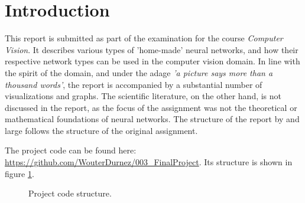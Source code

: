 


\section{Introduction}
\label{sec:intro}

This report is submitted as part of the examination for the course \textit{Computer Vision}. It describes various types of 'home-made' neural networks, and how their respective network types can be used in the computer vision domain. In line with the spirit of the domain, and under the adage \textit{'a picture says more than a thousand words'}, the report is accompanied by a substantial number of visualizations and graphs. The scientific literature, on the other hand, is not discussed in the report, as the focus of the assignment was not the theoretical or mathematical foundations of neural networks. The structure of the report by and large follows the structure of the original assignment. 

\vspace{5mm} %

The project code can be found here: \textcolor{blue}{\url{https://github.com/WouterDurnez/003_FinalProject}}. Its structure is shown in figure \ref{fig:project_structure}.

\begin{figure}[!htbp]
\begin{center}
\begin{minipage}{4cm}
\end{minipage}
\end{center}\caption{Project code structure.}
\label{fig:project_structure}
\end{figure}

